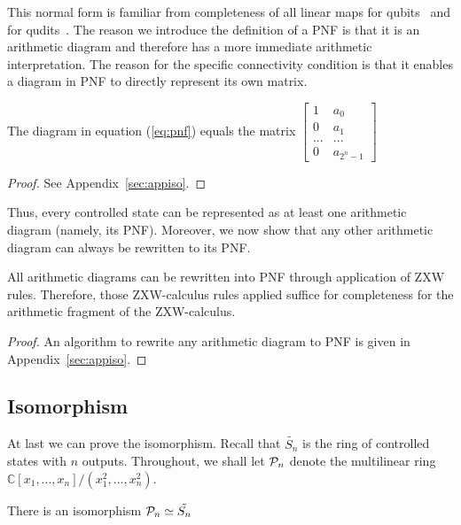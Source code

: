 This normal form is familiar from completeness of all linear maps for qubits~\cite{Hadzihasanovic2018zwzxcomplete} and for qudits~\cite{poor2023completeness}. The reason we introduce the definition of a PNF is that it is an arithmetic diagram and therefore has a more immediate arithmetic interpretation. The reason for the specific connectivity condition is that it enables a diagram in PNF to directly represent its own matrix.

\begin{prop}\label{prop:vec_pnf}
The diagram in equation (\ref{eq:pnf}) equals the matrix
    $\begin{bmatrix}
            1 &  a_0 \\ 0 & a_1 \\ ... & ... \\ 0 & a_{2^n-1}
        \end{bmatrix}$
\end{prop} 

\begin{proof}
    See Appendix~\ref*{sec:appiso}.
\end{proof}

Thus, every controlled state can be represented as at least one arithmetic diagram (namely, its PNF). Moreover, we now show that any other arithmetic diagram can always be rewritten to its PNF.


\begin{thm}\label{thm:uni_pnf}
    All arithmetic diagrams can be rewritten into PNF through application of ZXW rules. Therefore, those ZXW-calculus rules applied suffice for completeness for the arithmetic fragment of the ZXW-calculus.
\end{thm}

\begin{proof}
    An algorithm to rewrite any arithmetic diagram to PNF is given in Appendix~\ref*{sec:appiso}.
\end{proof}

\subsection{Isomorphism}
At last we can prove the isomorphism. Recall that $\tilde{S_n}$ is the ring of controlled states with $n$ outputs. Throughout, we shall let $\mathcal{P}_{n}$ denote the multilinear ring $\mathbb{C}[x_1, ..., x_{n}]/(x_1^2, ..., x_{n}^2)$.

\begin{thm}\label{thm:iso}
    There is an isomorphism $\mathcal{P}_{n} \simeq \tilde{S_n}$
\end{thm}

